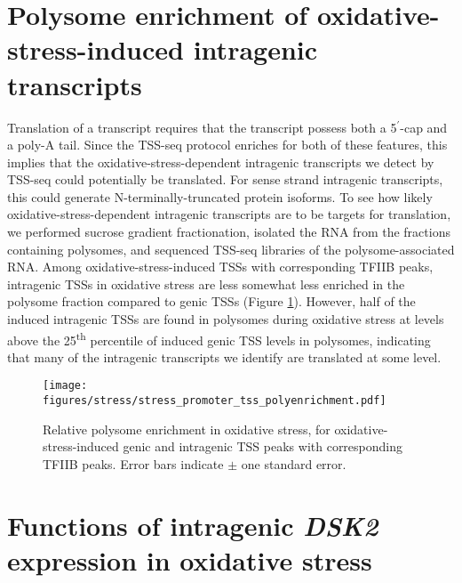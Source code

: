 \section{Polysome enrichment of oxidative-stress-induced intragenic transcripts}

Translation of a transcript requires that the transcript possess both a 5$^\prime$-cap and a poly-A tail.
Since the TSS-seq protocol enriches for both of these features, this implies that the oxidative-stress-dependent intragenic transcripts we detect by TSS-seq could potentially be translated.
For sense strand intragenic transcripts, this could generate N-terminally-truncated protein isoforms.
To see how likely oxidative-stress-dependent intragenic transcripts are to be targets for translation, we performed sucrose gradient fractionation, isolated the RNA from the fractions containing polysomes, and sequenced TSS-seq libraries of the polysome-associated RNA.
Among oxidative-stress-induced TSSs with corresponding TFIIB peaks, intragenic TSSs in oxidative stress are less somewhat less enriched in the polysome fraction compared to genic TSSs (Figure \ref{fig:stress_promoter_tss_polyenrichment}).
However, half of the induced intragenic TSSs are found in polysomes during oxidative stress at levels above the 25\textsuperscript{th} percentile of induced genic TSS levels in polysomes, indicating that many of the intragenic transcripts we identify are translated at some level.

\begin{figure}[h]
    \texttt{[image: figures/stress/stress\_promoter\_tss\_polyenrichment.pdf]}
    \caption[Relative polysome enrichment in oxidative stress, for oxidative-stress-induced genic and intragenic promoters.]{Relative polysome enrichment in oxidative stress, for oxidative-stress-induced genic and intragenic TSS peaks with corresponding TFIIB peaks. Error bars indicate $\pm$ one standard error.}
    \label{fig:stress_promoter_tss_polyenrichment}
\end{figure}

\section{Functions of intragenic \textit{DSK2} expression in oxidative stress}

